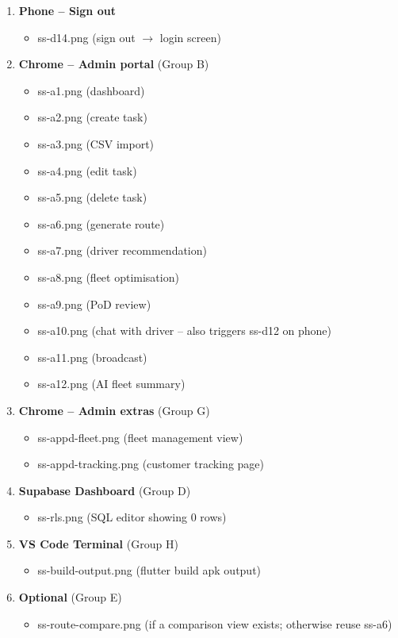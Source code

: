 \documentclass[11pt,a4paper]{article}
\newcommand{\checkbox}{$\square$\;}
\begin{document}
\begin{enumerate}[label=\textbf{Step \arabic*:}, leftmargin=3.5em]
  \item \textbf{Phone -- Sign out}
  \begin{itemize}[nosep]
    \item[\checkbox] ss-d14.png (sign out $\to$ login screen)
  \end{itemize}

  \item \textbf{Chrome -- Admin portal} (Group B)
  \begin{itemize}[nosep]
    \item[\checkbox] ss-a1.png (dashboard)
    \item[\checkbox] ss-a2.png (create task)
    \item[\checkbox] ss-a3.png (CSV import)
    \item[\checkbox] ss-a4.png (edit task)
    \item[\checkbox] ss-a5.png (delete task)
    \item[\checkbox] ss-a6.png (generate route)
    \item[\checkbox] ss-a7.png (driver recommendation)
    \item[\checkbox] ss-a8.png (fleet optimisation)
    \item[\checkbox] ss-a9.png (PoD review)
    \item[\checkbox] ss-a10.png (chat with driver -- also triggers ss-d12 on phone)
    \item[\checkbox] ss-a11.png (broadcast)
    \item[\checkbox] ss-a12.png (AI fleet summary)
  \end{itemize}

  \item \textbf{Chrome -- Admin extras} (Group G)
  \begin{itemize}[nosep]
    \item[\checkbox] ss-appd-fleet.png (fleet management view)
    \item[\checkbox] ss-appd-tracking.png (customer tracking page)
  \end{itemize}

  \item \textbf{Supabase Dashboard} (Group D)
  \begin{itemize}[nosep]
    \item[\checkbox] ss-rls.png (SQL editor showing 0 rows)
  \end{itemize}

  \item \textbf{VS Code Terminal} (Group H)
  \begin{itemize}[nosep]
    \item[\checkbox] ss-build-output.png (flutter build apk output)
  \end{itemize}

  \item \textbf{Optional} (Group E)
  \begin{itemize}[nosep]
    \item[\checkbox] ss-route-compare.png (if a comparison view exists; otherwise reuse ss-a6)
  \end{itemize}
\end{enumerate}
\end{document}
